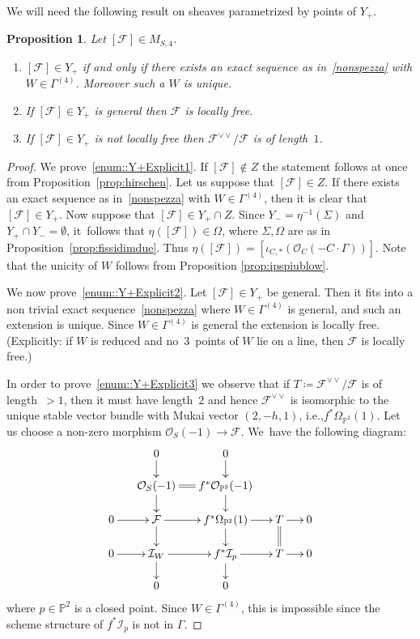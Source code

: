 \documentclass[11pt]{article}
\newcommand{\ie}{i.e.,\xspace}
\newenvironment{enumeratea}
{\bgroup\def\theenumi{\alph{enumi}}\begin{enumerate}}
{\end{enumerate}\egroup}
\newcommand{\PP}{{\mathbb P}}\let\P\PP
\newcommand\cF{\mathcal{F}}
\newcommand\cI{\mathcal{I}}
\newcommand\cO{\mathcal{O}}
\let\es\emptyset
\newtheorem{prop}[lemm]{Proposition}
\theoremstyle{definition}
\begin{document}
We will need the following result on sheaves parametrized by points of $Y_+$.

\begin{prop}\label{prop:Y+Explicit}
Let $[\cF] \in M_{S,4}$.
\begin{enumeratea}
\item\label{enum::Y+Explicit1} $[\cF] \in Y_+$ if and only if there exists an exact sequence as in~\eqref{nonspezza} with $W\in\mathsf{\Gamma}^{(4)}$. Moreover such a $W$ is unique.
\item\label{enum::Y+Explicit2} If $[\cF] \in Y_+$ is general then $\cF$ is locally free.
\item\label{enum::Y+Explicit3} If $[\cF] \in Y_+$ is not locally free then $\cF^{\vee\vee}/\cF$ is of length~$1$.
\end{enumeratea}
\end{prop}

\begin{proof}
We prove~\ref{enum::Y+Explicit1}.
If $[\cF]\notin Z$ the statement follows at once from Proposition~\ref{prop:hirschen}.
Let us suppose that $[\cF]\in Z$. If there exists an exact sequence as in~\eqref{nonspezza} with $W\in\mathsf{\Gamma}^{(4)}$, then it is clear that $[\cF] \in Y_+$. Now suppose that $[\cF]\in Y_{+}\cap Z$. Since $Y_{-}=\eta^{-1}(\Sigma)$ and $Y_{+}\cap Y_{-}=\es$, it~follows that $\eta([\cF])\in \Omega$, where $\Sigma,\Omega$ are as in Proposition~\ref{prop:fissidimdue}. Thus $\eta([\cF])=[\iota_{C,*}(\cO_C(-C\cdot\Gamma))]$. Note that the unicity of $W$ follows from Proposition \ref{prop:ipspiublow}.

We now prove~\ref{enum::Y+Explicit2}.
Let $[\cF] \in Y_+$ be general. Then it fits into a non trivial exact sequence~\eqref{nonspezza} where $W\in {\mathsf\Gamma}^{(4)}$ is general, and such an extension is unique. Since $W\in {\mathsf\Gamma}^{(4)}$ is general the extension is locally free.
(Explicitly: if $W$ is reduced and no~$3$~points of $W$ lie on a line, then $\cF$ is locally free.)

In order to prove~\ref{enum::Y+Explicit3} we observe that if $T\coloneqq\cF^{\vee\vee}/\cF$ is of length~$>1$, then it must have length~2 and hence $\cF^{\vee\vee}$ is isomorphic to the unique stable vector bundle with Mukai vector $(2,-h,1)$, \ie $f^*\Omega_{\PP^2}(1)$.
Let us choose a non-zero morphism $\cO_S(-1)\to \cF$. We~have the following diagram:
\begin{equation*}
\xymatrix@=.5cm{
&0\ar[d]&0\ar[d]&&\\
&\cO_S(-1)\ar@{=}[r]\ar[d]&f^*\cO_{\PP^2}(-1)\ar[d]&&\\
0\ar[r]&\cF\ar[r]\ar[d]&f^*\Omega_{\PP^2}(1)\ar[d]\ar[r]&T\ar[r]\ar@{=}[d]&0\\
0\ar[r]&\cI_W\ar[r]\ar[d]&f^*\cI_{p}\ar[d]\ar[r]&T\ar[r]&0\\
&0&0&&
}
\end{equation*}
where $p\in\PP^2$ is a closed point.
Since $W\in\mathsf{\Gamma}^{(4)}$, this is impossible since the scheme structure of $f^*\cI_p$ is not in $\mathsf{\Gamma}$.
\end{proof}
\end{document}
